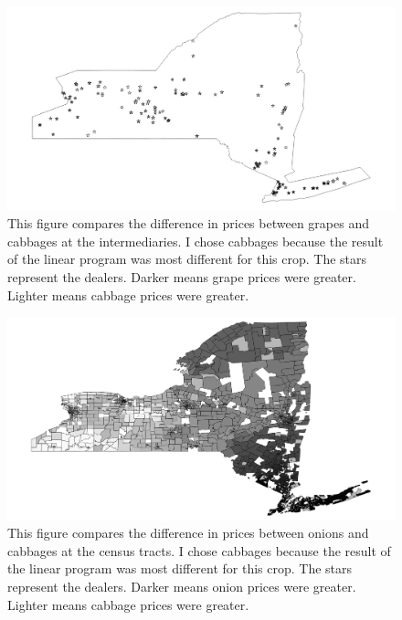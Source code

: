 \documentclass{report}
\begin{document}
\begin{figure}
\centering
\begin{framed}
\includegraphics[scale=.50]{procs_243_69}
\caption{This figure compares the difference in prices between grapes and cabbages at the intermediaries. I chose cabbages because the result of the linear program was most different for this crop. The stars represent the dealers. Darker means grape prices were greater. Lighter means cabbage prices were greater.}
\label{fig:procs_243_69}
\end{framed}
\end{figure}

\begin{figure}
\centering
\begin{framed}
\includegraphics[scale=.50]{stores_243_49}
\caption{This figure compares the difference in prices between onions and cabbages at the census tracts. I chose cabbages because the result of the linear program was most different for this crop. The stars represent the dealers. Darker means onion prices were greater. Lighter means cabbage prices were greater.}
\label{fig:stores_243_49}
\end{framed}
\end{figure}
\end{document}
